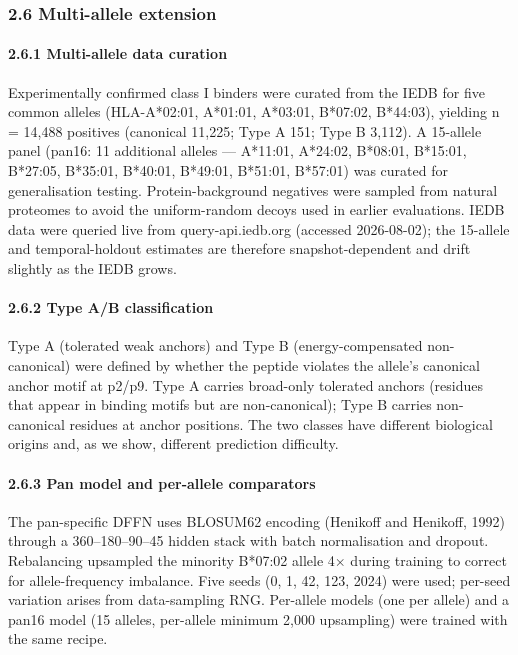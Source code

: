 \documentclass[10pt]{article}
\begin{document}
\subsubsection{2.6 Multi-allele extension}\label{multi-allele-extension}

\paragraph{2.6.1 Multi-allele data
curation}\label{multi-allele-data-curation}

Experimentally confirmed class I binders were curated from the IEDB
\cite{Vita19} for five common alleles (HLA-A*02:01, A*01:01,
A*03:01, B*07:02, B*44:03), yielding n = 14,488 positives (canonical
11,225; Type A 151; Type B 3,112). A 15-allele panel (pan16: 11
additional alleles --- A*11:01, A*24:02, B*08:01, B*15:01, B*27:05,
B*35:01, B*40:01, B*49:01, B*51:01, B*57:01) was curated for
generalisation testing. Protein-background negatives were sampled from
natural proteomes to avoid the uniform-random decoys used in earlier
evaluations. IEDB data were queried live from query-api.iedb.org
(accessed 2026-08-02); the 15-allele and temporal-holdout estimates are
therefore snapshot-dependent and drift slightly as the IEDB grows.

\paragraph{2.6.2 Type A/B classification}\label{type-ab-classification}

Type A (tolerated weak anchors) and Type B (energy-compensated
non-canonical) were defined by whether the peptide violates the allele's
canonical anchor motif at p2/p9. Type A carries broad-only tolerated
anchors (residues that appear in binding motifs but are non-canonical);
Type B carries non-canonical residues at anchor positions. The two
classes have different biological origins and, as we show, different
prediction difficulty.

\paragraph{2.6.3 Pan model and per-allele
comparators}\label{pan-model-and-per-allele-comparators}

The pan-specific DFFN uses BLOSUM62 encoding (Henikoff and Henikoff,
1992) through a 360--180--90--45 hidden stack with batch normalisation
and dropout. Rebalancing upsampled the minority B*07:02 allele 4$\times$ during
training to correct for allele-frequency imbalance. Five seeds (0, 1,
42, 123, 2024) were used; per-seed variation arises from data-sampling
RNG. Per-allele models (one per allele) and a pan16 model (15 alleles,
per-allele minimum 2,000 upsampling) were trained with the same recipe.
\end{document}
